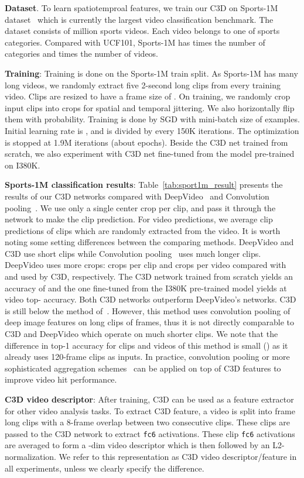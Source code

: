\documentclass[10pt,twocolumn,letterpaper]{article}
\begin{document}
{\bf Dataset}. To learn spatiotemproal features, we train our C3D on Sports-1M dataset~\cite{Karpathy14} which is currently the largest video classification benchmark. The dataset consists of  million sports videos. Each video belongs to one of  sports categories. Compared with UCF101, Sports-1M has  times the number of categories and  times the number of videos.

{\bf Training}: Training is done on the Sports-1M train split. As Sports-1M has many long videos, we randomly extract five 2-second long clips from every training video. Clips are resized to have a frame size of . On training, we randomly crop input clips into  crops for spatial and temporal jittering. We also horizontally flip them with  probability. Training is done by SGD with mini-batch size of  examples. Initial learning rate is , and is divided by  every 150K iterations. The optimization is stopped at 1.9M iterations (about  epochs). Beside the C3D net trained from scratch, we also experiment with C3D net fine-tuned from the model pre-trained on I380K.

{\bf Sports-1M classification results}:  
Table~\ref{tab:sport1m_result} presents the results of our C3D networks compared with DeepVideo~\cite{Karpathy14} and Convolution pooling~\cite{Ng15}. We use only a single center crop per clip, and pass it through the network to make the clip prediction. For video predictions, we average clip predictions of  clips which are randomly extracted from the video. It is worth noting some setting differences between the comparing methods. DeepVideo and C3D use short clips while Convolution pooling~\cite{Ng15} uses much longer clips. DeepVideo uses more crops:  crops per clip and  crops per video compared with  and  used by C3D, respectively. The C3D network trained from scratch yields an accuracy of  and the one fine-tuned from the I380K pre-trained model yields  at video top- accuracy. Both C3D networks outperform DeepVideo's networks. C3D is still  below the method of~\cite{Ng15}. However, this method uses convolution pooling of deep image features on long clips of  frames, thus it is not directly comparable to C3D and DeepVideo which operate on much shorter clips. We note that the difference in top-1 accuracy for clips and videos of this method is small () as it already uses 120-frame clips as inputs. In practice, convolution pooling or more sophisticated aggregation schemes~\cite{Ng15} can be applied on top of C3D features to improve video hit performance.


{\bf C3D video descriptor}: After training, C3D can be used as a feature extractor for other video analysis tasks. To extract C3D feature, a video is split into  frame long clips with a 8-frame overlap between two consecutive clips. These clips are passed to the C3D network to extract \texttt{fc6} activations. These clip \texttt{fc6} activations are averaged to form a -dim video descriptor which is then followed by an L2-normalization. We refer to this representation as C3D video descriptor/feature in all experiments, unless we clearly specify the difference.
\end{document}
